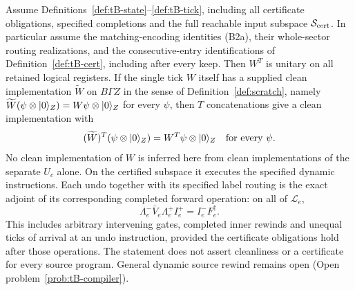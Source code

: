 \begin{theorem}
\label{thm:tB-sound}
Assume Definitions~\ref{def:tB-state}--\ref{def:tB-tick}, including all
certificate obligations, specified completions and the full reachable
input subspace $\mathcal S_{\rm cert}$. In particular assume the
matching-encoding identities (B2a), their whole-sector routing
realizations, and the consecutive-entry identifications of
Definition~\ref{def:tB-cert}, including after every keep.
Then $W^T$ is unitary on all retained logical registers.
If the single tick $W$ itself has a supplied clean implementation
$\widetilde W$ on $B\Gamma Z$ in the sense of
Definition~\ref{def:scratch}, namely
$\widetilde W(\psi\otimes\lvert 0\rangle_Z)=W\psi\otimes\lvert 0\rangle_Z$ for every
$\psi$, then $T$ concatenations give a clean implementation with
\[
 (\widetilde W)^T(\psi\otimes\lvert 0\rangle_Z)
       =W^T\psi\otimes\lvert 0\rangle_Z\quad\hbox{for every }\psi.
\]
No clean implementation of $W$ is inferred here from clean
implementations of the separate $U_c$ alone.
On the certified subspace it executes the specified dynamic instructions.
Each undo together with its specified label routing is the exact adjoint
of its corresponding completed forward operation: on all of
$\mathcal L_e$,
\[
 \Lambda_e^-\bar V_e\Lambda_e^+ I_e^+
       = I_e^-F_e^\dagger.                              \tag{B2b}
\]
This includes arbitrary intervening gates, completed inner rewinds and
unequal ticks of arrival at an undo instruction, provided the certificate
obligations hold after those operations. The statement does not assert
cleanliness or a certificate for every source program. General dynamic
source rewind remains open (Open problem~\ref{prob:tB-compiler}).
\end{theorem}

